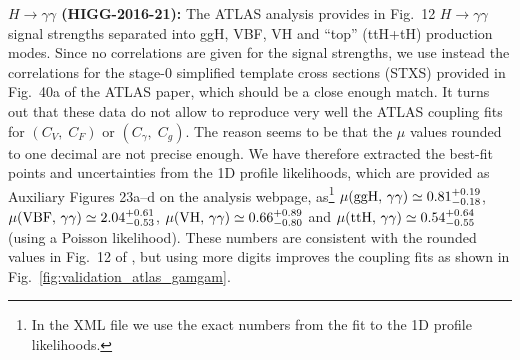 {\bf\boldmath $H\to\gamma\gamma$ (HIGG-2016-21):}  
The ATLAS analysis \cite{Aaboud:2018xdt} provides in Fig.~12 $H\to\gamma\gamma$ signal strengths separated into   
ggH, VBF, VH and ``top'' (ttH+tH) production modes. Since no correlations are given for the signal strengths, we 
use instead the correlations for the stage-0 simplified template cross sections (STXS) provided in Fig.~40a of the ATLAS 
paper, which should be a close enough match. It turns out that these data do not allow to reproduce very well the 
ATLAS coupling fits for $(C_V,\;C_F)$ or $(C_\gamma,\;C_g)$. The reason seems to be that the $\mu$ values 
rounded to one decimal are not  precise enough. We have therefore extracted the best-fit points and uncertainties 
from the 1D profile likelihoods, which are provided as Auxiliary Figures 23a--d on the analysis webpage, 
as\footnote{In the XML file we use the exact numbers from the fit to the 1D profile likelihoods.}  
$\mu({\rm ggH},\,\gamma\gamma)\simeq 0.81^{+0.19}_{-0.18}$, 
$\mu({\rm VBF},\,\gamma\gamma)\simeq 2.04^{+0.61}_{-0.53}$, 
$\mu({\rm VH},\,\gamma\gamma)\simeq 0.66^{+0.89}_{-0.80}$ and 
$\mu({\rm ttH},\,\gamma\gamma)\simeq 0.54^{+0.64}_{-0.55}$ (using a Poisson likelihood).   
These numbers are consistent with the rounded values in Fig.~12 of \cite{Aaboud:2018xdt}, but using more digits 
improves the coupling fits as shown in Fig.~\ref{fig:validation_atlas_gamgam}.


